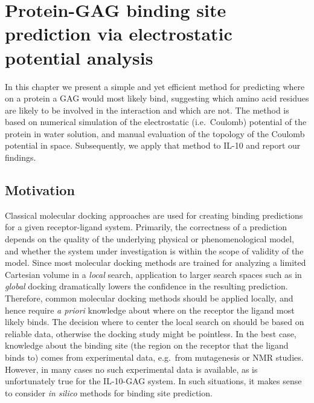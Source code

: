 \chapter{Protein-GAG binding site prediction via electrostatic potential analysis}

In this chapter we present a simple and yet efficient method for predicting
where on a protein a GAG would most likely bind, suggesting which amino acid
residues are likely to be involved in the interaction and which are not. The
method is based on numerical simulation of the electrostatic (i.e.\ Coulomb)
potential of the protein in water solution, and manual evaluation of the
topology of the Coulomb potential in space. Subsequently, we apply that method
to IL-10 and report our findings.

\section{Motivation}

Classical molecular docking approaches are used for creating binding predictions
for a given receptor-ligand system. Primarily, the correctness of a prediction
depends on the quality of the underlying physical or phenomenological model, and
whether the system under investigation is within the scope of validity of the
model. Since most molecular docking methods are trained for analyzing a limited
Cartesian volume in a \textit{local} search, application to larger search spaces
such as in \textit{global} docking dramatically lowers the confidence in the
resulting prediction. Therefore, common molecular docking methods should be
applied locally, and hence require \textit{a priori} knowledge about where on
the receptor the ligand most likely binds. The decision where to center the
local search on should be based on reliable data, otherwise the docking study
might be pointless. In the best case, knowledge about the binding site (the
region on the receptor that the ligand binds to) comes from experimental data,
e.g.\ from mutagenesis or NMR studies. However, in many cases no such
experimental data is available, as is unfortunately true for the IL-10-GAG
system. In such situations, it makes sense to consider \textit{in silico}
methods for binding site prediction.


